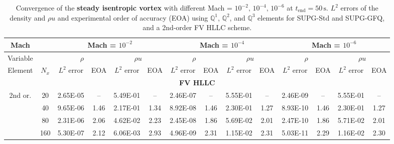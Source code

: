 \documentclass[a4paper,10pt]{article}
\begin{document}
\begin{table}
	\small
	\centering
	\caption{Convergence of the \textbf{steady isentropic vortex} with different Mach = $10^{-2},\,10^{-4},\,10^{-6}$ at $t_{\mathrm{end}} = 50\,\mathrm{s}$. 
		$L^2$ errors of the density and $\rho u$ and experimental order of accuracy (EOA)  
		using $\mathbb{Q}^1$, $\mathbb{Q}^2$, and $\mathbb{Q}^3$ elements for SUPG-Std and SUPG-GFQ, and a 2nd-order FV HLLC scheme.}\label{tab:low_mach_conv}
	\begin{tabular}{c|c|cc|cc|cc|cc|cc|cc}
		\hline
		{Mach}   & & \multicolumn{4}{c|}{Mach = $10^{-2}$} & \multicolumn{4}{c|}{Mach = $10^{-4}$} & \multicolumn{4}{c}{Mach = $10^{-6}$} \\ \hline
		{Variable} &  
		& \multicolumn{2}{c|}{$\rho$} 
		& \multicolumn{2}{c|}{$\rho u$} 
		& \multicolumn{2}{c|}{$\rho$} 
		& \multicolumn{2}{c|}{$\rho u$} 
		& \multicolumn{2}{c|}{$\rho$}  
		& \multicolumn{2}{c}{$\rho u$} \\
		\hline
		Element& $N_x$ & $L^2$ error & EOA &$L^2$ error & EOA &$L^2$ error & EOA &$L^2$ error & EOA & $L^2$ error & EOA & $L^2$ error & EOA \\
		\hline
		
		\multicolumn{14}{c}{\textbf{FV HLLC}} \\
		\hline
		2nd or.   	& 20    & 2.65E-05 & --   & 5.49E-01 & --   & 2.46E-07 & --   & 5.55E-01 & --   & 2.46E-09 & --   & 5.55E-01 & --   \\
		& 40    & 9.65E-06 & 1.46 & 2.17E-01 & 1.34 & 8.92E-08 & 1.46 & 2.30E-01 & 1.27 & 8.93E-10 & 1.46 & 2.30E-01 & 1.27 \\
		& 80    & 2.31E-06 & 2.06 & 4.62E-02 & 2.23 & 2.45E-08 & 1.86 & 5.69E-02 & 2.01 & 2.47E-10 & 1.86 & 5.71E-02 & 2.01 \\
		& 160 	& 5.30E-07 & 2.12 & 6.06E-03 & 2.93 & 4.96E-09 & 2.31 & 1.15E-02 & 2.31 & 5.03E-11 & 2.29 & 1.16E-02 & 2.30 \\ \hline
		

\end{tabular}
\end{table}
\end{document}
